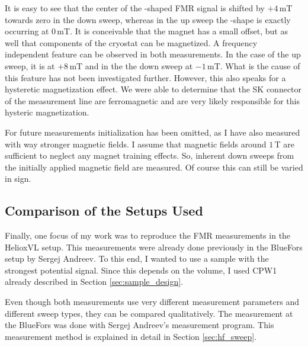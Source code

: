 It is easy to see that the center of the -shaped FMR signal is shifted by $+4\,$mT towards zero in the down sweep, whereas in the up sweep the -shape is exactly occurring at $0\,$mT. It is conceivable that the magnet has a small offset, but as well that components of the cryostat can be magnetized. A frequency independent feature can be observed in both measurements. In the case of the up sweep, it is at $+8\,$mT and in the the down sweep at $-1\,$mT. What is the cause of this feature has not been investigated further. However, this also speaks for a hysteretic magnetization effect. We were able to determine that the SK connector of the measurement line are ferromagnetic and are very likely responsible for this hysteric magnetization.

For future measurements initialization has been omitted, as I have also measured with way stronger magnetic fields. I assume that magnetic fields around $1\,$T are sufficient to neglect any magnet training effects. So, inherent down sweeps from the initially applied magnetic field are measured. Of course this can still be varied in sign.

\subsection{Comparison of the Setups Used}
Finally, one focus of my work was to reproduce the FMR measurements in the HelioxVL setup. This measurements were already done previously in the BlueFors setup by Sergej Andreev. To this end, I wanted to use a sample with the strongest potential signal. Since this depends on the volume, I used CPW1 already described in Section \ref{sec:sample_design}.

Even though both measurements use very different measurement parameters and different sweep types, they can be compared qualitatively. The measurement at the BlueFors was done with Sergej Andreev's measurement program. This measurement method is explained in detail in Section \ref{sec:hf_sweep}. 

